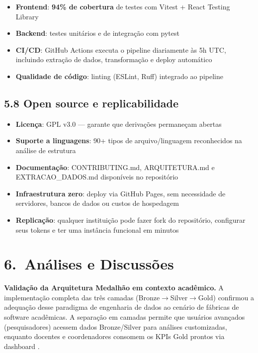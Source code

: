\documentclass[
	12pt,
	openright,
	oneside,
	a4paper,
	brazil
]{abntex2}
\begin{document}
\begin{itemize}
    \item \textbf{Frontend}: \textbf{94\% de cobertura} de testes com Vitest + React Testing Library
    \item \textbf{Backend}: testes unitários e de integração com pytest
    \item \textbf{CI/CD}: GitHub Actions executa o pipeline diariamente às 5h UTC, incluindo extração de dados, transformação e deploy automático
    \item \textbf{Qualidade de código}: linting (ESLint, Ruff) integrado ao pipeline
\end{itemize}

\subsection*{5.8 Open source e replicabilidade}

\begin{itemize}
    \item \textbf{Licença}: GPL v3.0 --- garante que derivações permaneçam abertas
    \item \textbf{Suporte a linguagens}: 90+ tipos de arquivo/linguagem reconhecidos na análise de estrutura
    \item \textbf{Documentação}: CONTRIBUTING.md, ARQUITETURA.md e EXTRACAO\_DADOS.md disponíveis no repositório
    \item \textbf{Infraestrutura zero}: deploy via GitHub Pages, sem necessidade de servidores, bancos de dados ou custos de hospedagem
    \item \textbf{Replicação}: qualquer instituição pode fazer fork do repositório, configurar seus tokens e ter uma instância funcional em minutos
\end{itemize}

\section*{6.\ Análises e Discussões}

\textbf{Validação da Arquitetura Medalhão em contexto acadêmico.} A implementação completa das três camadas (Bronze$\rightarrow$Silver$\rightarrow$Gold) confirmou a adequação desse paradigma de engenharia de dados ao cenário de fábricas de software acadêmicas. A separação em camadas permite que usuários avançados (pesquisadores) acessem dados Bronze/Silver para análises customizadas, enquanto docentes e coordenadores consomem os KPIs Gold prontos via dashboard \cite{barbosaGeracaoGitHub,oliveira2022plataforma}.
\end{document}
